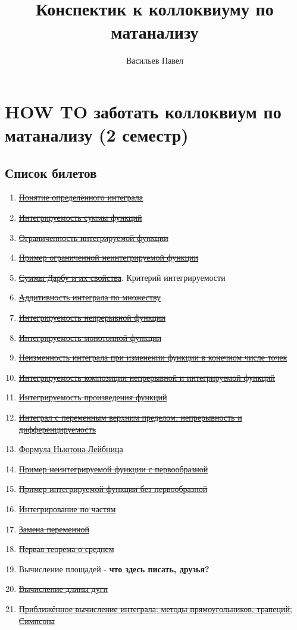 \documentclass[a4paper]{article}
\title{Конспектик к коллоквиуму по матанализу}
\author{Васильев Павел}
\begin{document}
\section*{HOW TO заботать коллоквиум по матанализу (2 семестр)}


\subsection*{Список билетов}
\begin{enumerate}
\item \hyperlink{p1}{\sout{Понятие определённого интеграла}}
\item \hyperlink{p2}{\sout{Интегрируемость суммы функций}}
\item \hyperlink{p3}{\sout{Ограниченность интегрируемой функции}}
\item \hyperlink{p4}{\sout{Пример ограниченной неинтегрируемой функции}}
\item \hyperlink{p5}{\sout{Суммы Дарбу и их свойства}}. Критерий интегрируемости
\item \hyperlink{p6}{\sout{Аддитивность интеграла по множеству}}
\item \hyperlink{p7}{\sout{Интегрируемость непрерывной функции}}
\item \hyperlink{p8}{\sout{Интегрируемость монотонной функции}}
\item \hyperlink{p9}{\sout{Неизменность интеграла при изменении функции в конечном числе точек}}
\item \hyperlink{p10}{\sout{Интегрируемость композиции непрерывной и интегрируемой функций}}
\item \hyperlink{p11}{\sout{Интегрируемость произведения функций}}
\item \hyperlink{p12}{\sout{Интеграл с переменным верхним пределом: непрерывность и дифференцируемость}}
\item \hyperlink{p13}{Формула Ньютона-Лейбница}
\item \hyperlink{p14}{\sout{Пример неинтегрируемой функции с первообразной}}
\item \hyperlink{p15}{\sout{Пример интегрируемой функции без первообразной}}
\item \hyperlink{p16}{\sout{Интегрирование по частям}}
\item \hyperlink{p17}{\sout{Замена переменной}}
\item \hyperlink{p18}{\sout{Первая теорема о среднем}}
\item Вычисление площадей - \textbf{что здесь писать, друзья?}
\item \hyperlink{p20}{\sout{Вычисление длины дуги}}
\item\hyperlink{p21}{\sout{Приближённое вычисление интеграла: методы прямоугольников, трапеций, Симпсона}}
\end{enumerate}
\end{document}
